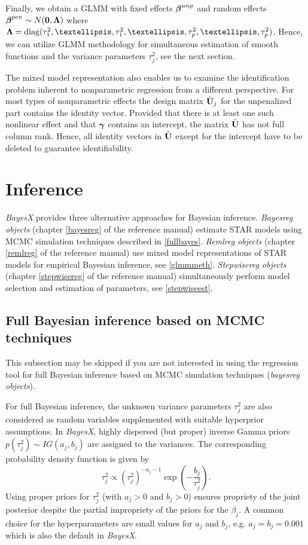 \documentclass[11pt,a4paper,twoside]{bayesxarticle}
\begin{document}
Finally, we obtain a GLMM with fixed effects $\boldsymbol{\beta}^{unp}$ and
random effects $\boldsymbol{\beta}^{pen} \sim N(\boldsymbol{0},\boldsymbol{\Lambda})$ where $\Lambdavec =
\diag(\tau^2_1,\dots,\tau^2_1,\dots,\tau^2_p,\dots,\tau^2_p)$.
Hence, we can utilize GLMM methodology for simultaneous estimation
of smooth functions and the variance parameters $\tau^2_j$, see the
next section.

The mixed model representation also enables us to examine the
identification problem inherent to nonparametric regression from a
different perspective. For most types of nonparametric effects the
design matrix $\tilde{\mathbf{U}}_j$ for the unpenalized part contains the
identity vector. Provided that there is at least one such nonlinear
effect and that $\boldsymbol{\gamma}$ contains an intercept, the matrix
$\tilde{\mathbf{U}}$ has not full column rank. Hence, all identity vectors in
$\tilde{\mathbf{U}}$ except for the intercept have to be deleted to guarantee
identifiability.


\section{Inference}
\label{inference}

{\em BayesX} provides three alternative approaches for Bayesian inference. {\em Bayesreg objects} (chapter \ref*{bayesreg} of
the reference manual) estimate STAR models using MCMC simulation techniques described in \autoref{fullbayes}. {\em Remlreg
objects} (chapter \ref*{remlreg} of the reference manual) use mixed model representations of STAR models for empirical Bayesian
inference, see \autoref{glmmmeth}. {\em Stepwisereg objects} (chapter \ref*{stepwisereg} of the reference manual)
simultaneously perform model selection and estimation of parameters, see \autoref{stepwiseest}.



\subsection{Full Bayesian inference based on MCMC techniques}
\label{fullbayes}

This subsection may be skipped if you are not interested in using
the regression tool for full Bayesian inference based on MCMC
simulation techniques ({\em bayesreg objects}).

For full Bayesian inference, the unknown variance parameters
$\tau_j^2$ are also considered as random variables supplemented with
suitable hyperprior assumptions. In {\em BayesX}, highly dispersed
(but proper) inverse Gamma priors $p(\tau^2_j) \sim IG(a_j,b_j)$ are
assigned to the variances. The corresponding probability density
function is given by
$$
 \tau_j^2 \propto (\tau^2_j)^{-a_j-1}\exp\left(-\frac{b_j}{\tau^2_j}\right).
$$
Using proper priors for $\tau_j^2$ (with $a_j>0$ and $b_j>0$)
ensures propriety of the joint posterior despite the partial
impropriety of the priors for the $\beta_j$. A common choice for the
hyperparameters are small values for $a_j$ and $b_j$, e.g.
$a_j=b_j=0.001$ which is also the default in {\em BayesX}.
\end{document}
